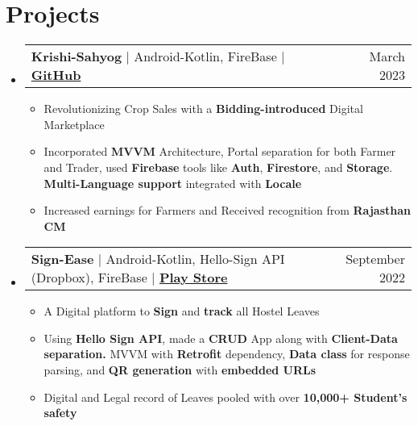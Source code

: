 \documentclass[letterpaper,11pt]{article}
\makeatletter
\newcommand{\resumeItem}[1]{
  \item\small{
    {#1 \vspace{-2pt}}
  }
}
\newcommand{\resumeProjectHeading}[2]{
    \item
    \begin{tabular*}{0.97\textwidth}{l@{\extracolsep{\fill}}r}
      \small#1 & #2 \\
    \end{tabular*}\vspace{-7pt}
}
\newcommand{\resumeSubHeadingListStart}{\begin{itemize}[leftmargin=0.15in, label={}]}
\newcommand{\resumeSubHeadingListEnd}{\end{itemize}}
\newcommand{\resumeItemListStart}{\begin{itemize}}
\newcommand{\resumeItemListEnd}{\end{itemize}\vspace{-5pt}}
\makeatother
\begin{document}
\section{\textbf{Projects}}
\resumeSubHeadingListStart
      \resumeProjectHeading
          {\textbf{Krishi-Sahyog } $|$ {Android-Kotlin, FireBase} $|$ \textbf{\href{https://github.com/aniketk13/FarmApp}{GitHub}}}{March 2023}
          \resumeItemListStart
          \resumeItem{Revolutionizing Crop Sales with a \textbf{Bidding-introduced} Digital Marketplace}
          \resumeItem{Incorporated \textbf{MVVM} Architecture, Portal separation for both Farmer and Trader, used \textbf{Firebase} tools like \textbf{Auth}, \textbf{Firestore}, and \textbf{Storage}. \textbf{Multi-Language support} integrated with \textbf{Locale}}
          \resumeItem{Increased earnings for Farmers and Received recognition from \textbf{Rajasthan CM}}
          \resumeItemListEnd
    \resumeSubHeadingListEnd
 \resumeSubHeadingListStart
      \resumeProjectHeading
          {\textbf{Sign-Ease } $|${ Android-Kotlin, Hello-Sign API (Dropbox), FireBase} $|$ \textbf{\href{https://play.google.com/store/apps/details?id=com.teamdefine.signease}{Play Store}} }{September 2022}
          \resumeItemListStart
          \resumeItem{A Digital platform to \textbf{Sign} and \textbf{track} all Hostel Leaves}
          \resumeItem{Using \textbf{Hello Sign API}, made a \textbf{CRUD} App along with \textbf{Client-Data separation.} MVVM with \textbf{Retrofit} dependency, \textbf{Data class} for response parsing, and \textbf{QR generation} with \textbf{embedded URLs}}
          \resumeItem{Digital and Legal record of Leaves pooled with over \textbf{10,000+ Student's safety}}
          \resumeItemListEnd
    \resumeSubHeadingListEnd
    
    
\end{document}
